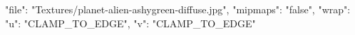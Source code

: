 {
  "file": "Textures/planet-alien-ashygreen-diffuse.jpg",
  "mipmaps": "false",
  "wrap": {
    "u": "CLAMP_TO_EDGE",
    "v": "CLAMP_TO_EDGE"
  }
}